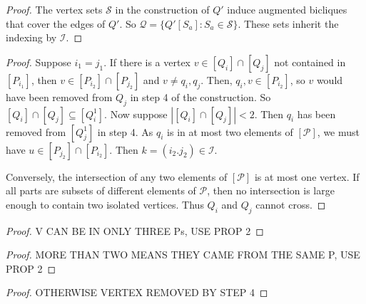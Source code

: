 



\begin{proof}
	The vertex sets $\mathcal{S}$ in the construction of $Q'$ induce augmented bicliques that cover the edges of $Q'$. So $\mathcal{Q}= \{Q'[S_a]: S_a \in \mathcal{S}\}$.  These sets inherit the indexing by $\mathcal{I}$.
\end{proof}

\begin{proof}
	Suppose $i_1 = j_1$. If there is a vertex $v \in [Q_i] \cap [Q_j]$ not contained in $[P_{i_1}]$, then $v \in [P_{i_2}] \cap [P_{j_2}]$ and $v \neq q_i, q_j$.
%
	Then, $q_i, v \in [P_{i_2}]$, so $v$ would have been removed from $Q_j$ in step 4 of the construction.  
%
	So $[Q_i] \cap [Q_j] \subseteq [Q_i^1]$.  
%
	Now suppose $|[Q_i] \cap [Q_j]| < 2$.
%
	Then $q_i$ has been removed from $[Q_j^1]$ in step 4.  
%
	As $q_i$ is in at most two elements of $[\mathcal{P}]$, we must have $u \in [P_{j_2}] \cap [P_{i_2}]$.
%
	Then $k = (i_2. j_2) \in \mathcal{I}$. 
%
		
	
	Conversely, the intersection of any two elements of $[\mathcal{P}]$ is at most one vertex.  If all parts are subsets of different elements of $\mathcal{P}$, then no intersection is large enough to contain two isolated vertices.  Thus $Q_i$ and $Q_j$ cannot cross.
\end{proof}

\begin{proof}
	V CAN BE IN ONLY THREE Ps, USE PROP 2
\end{proof}

\begin{proof}
	MORE THAN TWO MEANS THEY CAME FROM THE SAME P, USE PROP 2
\end{proof}

\begin{proof}
	OTHERWISE VERTEX REMOVED BY STEP 4
\end{proof}

